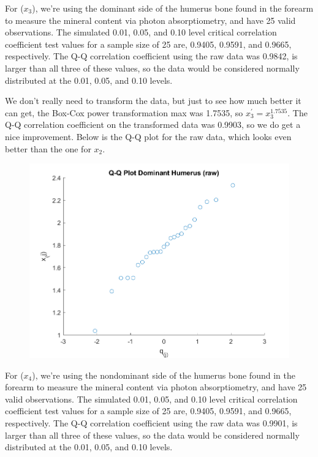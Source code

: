 For ($x_{3}$), we're using the dominant side of the humerus bone found in the forearm to measure the mineral content via photon absorptiometry, and have 25 valid observations. The simulated 0.01, 0.05, and 0.10 level critical correlation coefficient test values for a sample size of 25 are, 0.9405, 0.9591, and 0.9665, respectively. The Q-Q correlation coefficient using the raw data was 0.9842, is larger than all three of these values, so the data would be considered normally distributed at the 0.01, 0.05, and 0.10 levels.

We don't really need to transform the data, but just to see how much better it can get, the Box-Cox power transformation max was 1.7535, so $x_{3}^{\prime} = x_{3}^{1.7535}$. The Q-Q correlation coefficient on the transformed data was 0.9903, so we do get a nice improvement. Below is the Q-Q plot for the raw data, which looks even better than the one for $x_{2}$.

\begin{center}
    \begin{figure}[H]
        \centering
        \includegraphics[scale=0.6]{./matlab/chapter-4/sol4.34.qq.3.png}
    \end{figure}
\end{center}

For ($x_{4}$), we're using the nondominant side of the humerus bone found in the forearm to measure the mineral content via photon absorptiometry, and have 25 valid observations. The simulated 0.01, 0.05, and 0.10 level critical correlation coefficient test values for a sample size of 25 are, 0.9405, 0.9591, and 0.9665, respectively. The Q-Q correlation coefficient using the raw data was 0.9901, is larger than all three of these values, so the data would be considered normally distributed at the 0.01, 0.05, and 0.10 levels.

